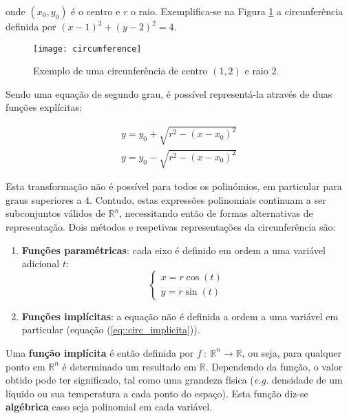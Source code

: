 onde $(x_0, y_0)$ é o centro e $r$ o raio. Exemplifica-se na Figura \ref{fig::circumference} a circunferência definida por $(x - 1)^2 + (y - 2)^2 = 4$.

\begin{figure}[!btp]
	\centering
	\texttt{[image: circumference]}
	\caption[Exemplo de uma circunferência]{Exemplo de uma circunferência de centro $(1, 2)$ e raio $2$.}
	\label{fig::circumference}
\end{figure}

Sendo uma equação de segundo grau, é possível representá-la através de duas funções explícitas:

\begin{eqnarray}
		y = y_0 + \sqrt{r^2 - (x - x_0)^2} \\
		y = y_0 - \sqrt{r^2 - (x - x_0)^2}
\end{eqnarray}

Esta transformação não é possível para todos os polinómios, em particular para graus superiores a $4$. Contudo, estas expressões polinomiais continuam a ser subconjuntos válidos de $\mathbb{R}^n$, necessitando então de formas alternativas de representação. Dois métodos e respetivas representações da circunferência são:

\begin{enumerate}
	\item \textbf{Funções paramétricas}: cada eixo é definido em ordem a uma variável adicional $t$:
	\begin{equation}
		\left\{\begin{array}{l}
			x = r\cos(t) \\
			y = r\sin(t)
		\end{array}\right.
	\label{eq::circ_parametrica}
	\end{equation}
	
	\item \textbf{Funções implícitas}: a equação não é definida a ordem a uma variável em particular (equação (\ref{eq::circ_implicita})).
\end{enumerate}

Uma \textbf{função implícita} é então definida por $f~:~\mathbb{R}^n \longrightarrow \mathbb{R}$, ou seja, para qualquer ponto em $\mathbb{R}^n$ é determinado um resultado em $\mathbb{R}$. Dependendo da função, o valor obtido pode ter significado, tal como uma grandeza física (\textit{e.g.} densidade de um líquido ou sua temperatura a cada ponto do espaço). Esta função diz-se \textbf{algébrica} caso seja polinomial em cada variável.

